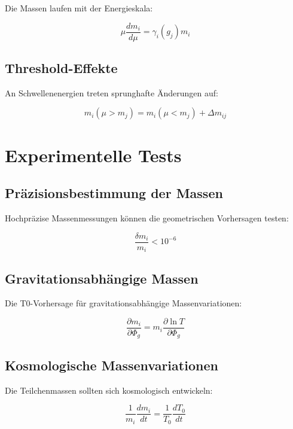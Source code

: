 \documentclass[12pt,a4paper]{report}
\begin{document}
	Die Massen laufen mit der Energieskala:
	
	\begin{equation}
		\mu\frac{dm_i}{d\mu} = \gamma_i(g_j) m_i
	\end{equation}
	
	\subsection{Threshold-Effekte}
	
	An Schwellenenergien treten sprunghafte Änderungen auf:
	
	\begin{equation}
		m_i(\mu > m_j) = m_i(\mu < m_j) + \Delta m_{ij}
	\end{equation}
	
	\section{Experimentelle Tests}
	
	\subsection{Präzisionsbestimmung der Massen}
	
	Hochpräzise Massenmessungen können die geometrischen Vorhersagen testen:
	
	\begin{equation}
		\frac{\delta m_i}{m_i} < 10^{-6}
	\end{equation}
	
	\subsection{Gravitationsabhängige Massen}
	
	Die T0-Vorhersage für gravitationsabhängige Massenvariationen:
	
	\begin{equation}
		\frac{\partial m_i}{\partial \Phi_g} = m_i \frac{\partial \ln T}{\partial \Phi_g}
	\end{equation}
	
	\subsection{Kosmologische Massenvariationen}
	
	Die Teilchenmassen sollten sich kosmologisch entwickeln:
	
	\begin{equation}
		\frac{1}{m_i}\frac{dm_i}{dt} = \frac{1}{T_0}\frac{dT_0}{dt}
	\end{equation}
	
\end{document}
